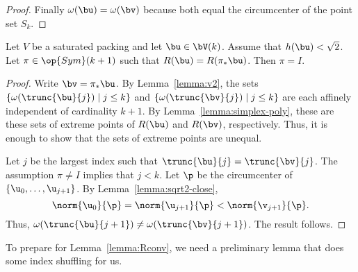 \begin{proof}
Finally $\omega(\bu) = \omega(\bv)$ because both equal the circumcenter of the
point set $S_k$.
%
\end{proof}

\begin{lemma}[] 
  Let $V$ be a saturated packing and let $\bu\in
  \bV(k)$.  Assume that $h(\bu)<\sqrt2$.  Let $\pi\in\op{Sym}(k+1)$ such that
 $R(\bu)= R(\pi_*\bu)$.  Then $\pi= I$.
\end{lemma}

\begin{proof} 
Write $\bv = \pi_*\bu$.  By Lemma~\ref{lemma:v2}, the sets
$\{\omega(\trunc{\bu}{j})\mid j\le k\}$ and 
$\{\omega(\trunc{\bv}{j})\mid j\le k\}$ are each affinely independent of
cardinality $k+1$.  By Lemma~\ref{lemma:simplex-poly}, these are these sets
of extreme points of $R(\bu)$ and $R(\bv)$, respectively.  Thus, it is enough
to show that the sets of extreme points are unequal.

Let $j$ be the largest index such that $\trunc{\bu}{j}=\trunc{\bv}{j}$.
The assumption $\pi\ne I$ implies that $j<k$.  Let $\p$ be the circumcenter
of $\{\u_0,\ldots,\u_{j+1}\}$.  By Lemma~\ref{lemma:sqrt2-close}, 
\begin{displaymath} 
\norm{\u_0}{\p} = \norm{\u_{j+1}}{\p} < \norm{\v_{j+1}}{\p}.
\end{displaymath}
Thus, $\omega(\trunc{\bu}{j+1}) \ne \omega(\trunc{\bv}{j+1})$.  The result follows.
\end{proof}

To prepare for Lemma~\ref{lemma:Rconv}, we need a preliminary lemma that
does some index shuffling for us.


